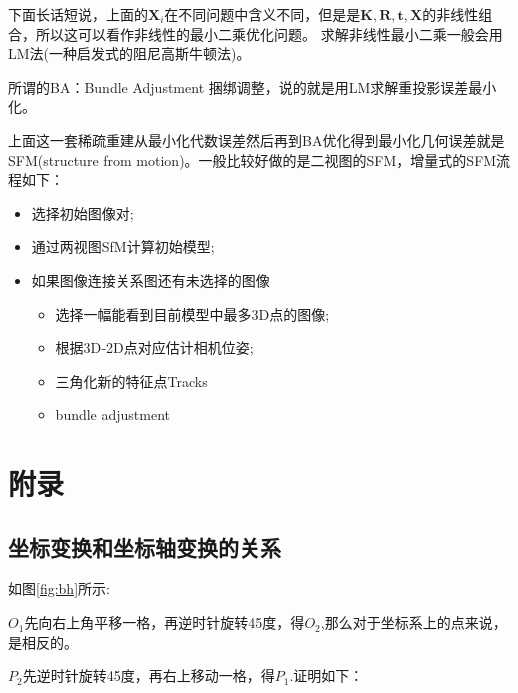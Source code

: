 \documentclass[12pt]{article}
\begin{document}
下面长话短说，上面的$\mathbf{X}_i$在不同问题中含义不同，但是是$\mathbf{K,R,t,X}$的非线性组合，所以这可以看作非线性的最小二乘优化问题。
求解非线性最小二乘一般会用LM法(一种启发式的阻尼高斯牛顿法)。

所谓的BA：Bundle Adjustment 捆绑调整，说的就是用LM求解重投影误差最小化。

上面这一套稀疏重建从最小化代数误差然后再到BA优化得到最小化几何误差就是SFM(structure from motion)。一般比较好做的是二视图的SFM，增量式的SFM流程如下：
\begin{itemize}
    \item 选择初始图像对;
    \item 通过两视图SfM计算初始模型;
    \item 如果图像连接关系图还有未选择的图像\begin{itemize}
        \item 选择一幅能看到目前模型中最多3D点的图像;
        \item 根据3D‐2D点对应估计相机位姿;
        \item 三角化新的特征点Tracks
        \item bundle adjustment
    \end{itemize}
\end{itemize}


\newpage
\section{附录}
\subsection{坐标变换和坐标轴变换的关系}
如图\ref{fig:bh}所示:

$O_1$先向右上角平移一格，再逆时针旋转45度，得$O_2$,那么对于坐标系上的点来说，是相反的。

$P_2$先逆时针旋转45度，再右上移动一格，得$P_1$.证明如下：
\end{document}
